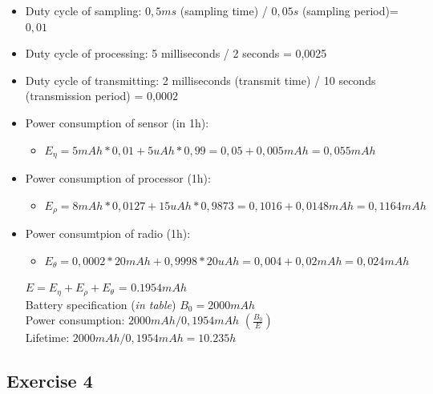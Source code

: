 \begin{itemize}
	\item Duty cycle of sampling: $0,5ms$ (sampling time) / $0,05s$ (sampling period)= $0,01$
	\item 
	Duty cycle of processing: 5 milliseconds / 2 seconds = 0,0025 
	\item 
	Duty cycle of transmitting: 2 milliseconds (transmit time) / 10 seconds (transmission period) = 0,0002
	\item 
	Power consumption of sensor (in 1h):
	\begin{itemize}
		\item 
		$E_{\eta} = 5 mAh * 0,01+ 5 uAh *0,99 =0,05+0,005 mAh = 0,055 mAh$
	\end{itemize}
	\item 
	Power consumption of processor (1h):
	\begin{itemize}
		\item 
		$E_{\rho} = 8 mAh * 0,0127+ 15 uAh *0,9873 =0,1016+0,0148 mAh = 0,1164 mAh$
	\end{itemize}
	\item 
	Power consumtpion of radio (1h):
	\begin{itemize}
		\item 
		$E_{\theta} = 0,0002 *20mAh + 0,9998 *20uAh = 0,004 + 0,02 mAh = 0,024 mAh$
		
		
	\end{itemize}
	
	\begin{center}
		$E = E_{\eta} + E_{\rho} + E_{\theta}$ = $0.1954 mAh$\\
		Battery specification (\textit{in table}) $B_{0} = 2000mAh$\\
		Power consumption: $2000 mAh / 0,1954 mAh$     $(\frac{B_{0}}{E})$\\
		Lifetime: $2000 mAh / 0,1954 mAh = 10.235 h$
	\end{center}
	
\end{itemize}


\subsection{Exercise 4}

